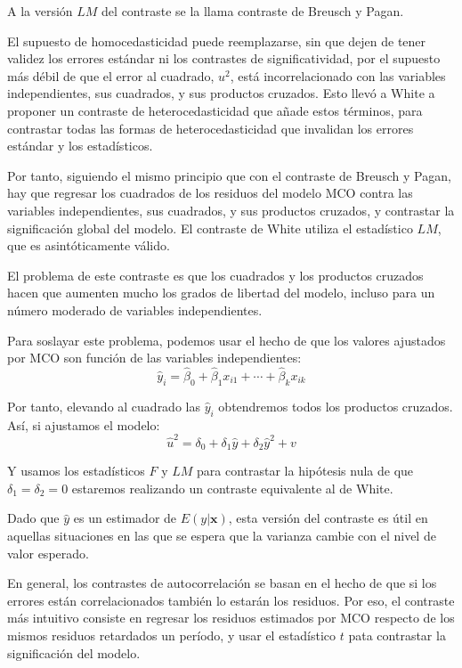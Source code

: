 A la versi\'on $LM$ del contraste se la llama contraste de Breusch y Pagan.


El supuesto de homocedasticidad puede reemplazarse, sin que dejen de tener validez los errores est\'andar ni los contrastes de significatividad, por el supuesto m\'as d\'ebil de que el error al cuadrado, $u^2$, est\'a incorrelacionado con las variables independientes, sus cuadrados, y sus productos cruzados. Esto llev\'o a White a proponer un contraste de heterocedasticidad que a\~nade estos t\'erminos, para contrastar todas las formas de heterocedasticidad que invalidan los errores est\'andar y los estad\'isticos.

Por tanto, siguiendo el mismo principio que con el contraste de Breusch y Pagan, hay que regresar los cuadrados de los residuos del modelo MCO contra las variables independientes, sus cuadrados, y sus productos cruzados, y contrastar la significaci\'on global del modelo. El contraste de White utiliza el estad\'istico $LM$, que es asint\'oticamente v\'alido.

El problema de este contraste es que los cuadrados y los productos cruzados hacen que aumenten mucho los grados de libertad del modelo, incluso para un n\'umero moderado de variables independientes.

Para soslayar este problema, podemos usar el hecho de que los valores ajustados por MCO son funci\'on de las variables independientes:
\[\hat{y}_i=\hat{\beta}_0+\hat{\beta}_1x_{i1}+\cdots+\hat{\beta}_kx_{ik}\]

Por tanto, elevando al cuadrado las $\hat{y}_i$ obtendremos todos los productos cruzados. As\'i, si ajustamos el modelo:
\[\hat{u}^2=\delta_0+\delta_1\hat{y}+\delta_2\hat{y}^2+v\]

Y usamos los estad\'isticos $F$ y $LM$ para contrastar la hip\'otesis nula de que $\delta_1=\delta_2=0$ estaremos realizando un contraste equivalente al de White.

Dado que $\hat{y}$ es un estimador de $E(y|\boldsymbol{x})$, esta versi\'on del contraste es \'util en aquellas situaciones en las que se espera que la varianza cambie con el nivel de valor esperado.



En general, los contrastes de autocorrelaci\'on se basan en el hecho de que si los errores est\'an correlacionados tambi\'en lo estar\'an los residuos. Por eso, el contraste m\'as intuitivo consiste en regresar los residuos estimados por MCO respecto de los mismos residuos retardados un per\'iodo, y usar el estad\'istico $t$ pata contrastar la significaci\'on del modelo. 

